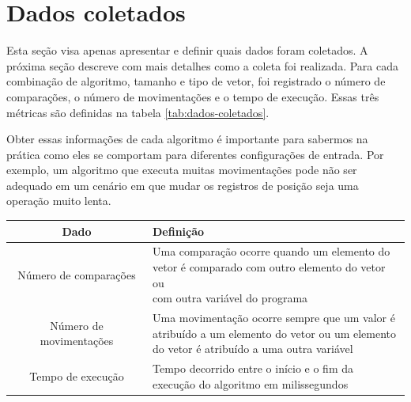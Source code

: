 \section{Dados coletados}
Esta seção visa apenas apresentar e definir quais dados foram coletados. A próxima seção descreve com mais detalhes como a coleta foi realizada. Para cada combinação de algoritmo, tamanho e tipo de vetor, foi registrado o número de comparações, o número de movimentações e o tempo de execução. Essas três métricas são definidas na tabela \ref{tab:dados-coletados}.

Obter essas informações de cada algoritmo é importante para sabermos na prática como eles se comportam para diferentes configurações de entrada. Por exemplo, um algoritmo que executa muitas movimentações pode não ser adequado em um cenário em que mudar os registros de posição seja uma operação muito lenta.

\begin{table}[H]
    \centering
    \begin{tabular}{ c | l }
        \hline
        Dado                    & Definição\\
        \hline
        Número de comparações   & \makecell[l]{Uma comparação ocorre quando um elemento do\\
                                               vetor é comparado com outro elemento do vetor ou\\
                                               com outra variável do programa}\\
        \hline
        Número de movimentações & \makecell[l]{Uma movimentação ocorre sempre que um valor é\\
                                               atribuído a um elemento do vetor ou um elemento\\
                                               do vetor é atribuído a uma outra variável}\\
        \hline
        Tempo de execução       & \makecell[l]{Tempo decorrido entre o início e o fim da\\
                                               execução do algoritmo em milissegundos}\\
        \hline
    \end{tabular}
\end{table}

